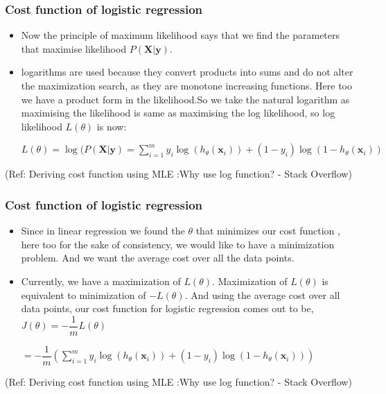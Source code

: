 \begin{frame}[fragile]\frametitle{Cost function of logistic regression}
\begin{itemize}
\item Now the principle of maximum likelihood says that we find the parameters that maximise likelihood $P(\mathbf{X}|\mathbf{y})$.
\item logarithms are used because they convert products into sums and do not alter the maximization search, as they are monotone increasing functions. Here too we have a product form in the likelihood.So we take the natural logarithm as maximising the likelihood is same as maximising the log likelihood, so log likelihood $L(\theta)$ is now:

$L(\theta) = \log(P(\mathbf{X}|\mathbf{y}) =  \sum_{i=1}^{m} y_i \log(h_{\theta}(\mathbf{x}_i)) + (1-y_i) \log(1 - h_{\theta}(\mathbf{x}_i))$
\end{itemize}

{\tiny (Ref: Deriving cost function using MLE :Why use log function? - Stack Overflow)}
\end{frame}

\begin{frame}[fragile]\frametitle{Cost function of logistic regression}
\begin{itemize}
\item Since in linear regression we found the $\theta$ that minimizes our cost function , here too for the sake of consistency, we would like to have a minimization problem. And we want the average cost over all the data points. 
\item Currently, we have a maximization of $L(\theta)$. Maximization of $L(\theta)$ is equivalent to minimization of $-L(\theta)$. And using the average cost over all data points, our cost function for logistic regression comes out to be, $J(\theta) = - \dfrac{1}{m} L(\theta)$

$= - \dfrac{1}{m} \left(  \sum_{i=1}^{m} y_i \log (h_{\theta}(\mathbf{x}_i)) +  (1-y_i) \log (1 - h_{\theta}(\mathbf{x}_i)) \right )$
\end{itemize}

{\tiny (Ref: Deriving cost function using MLE :Why use log function? - Stack Overflow)}
\end{frame}

